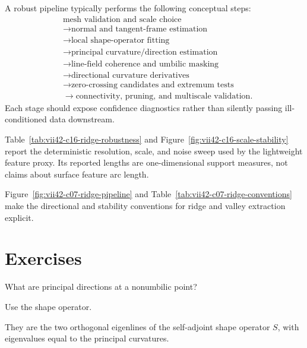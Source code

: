 A robust pipeline typically performs the following conceptual steps:
\[
\begin{aligned}
&\text{mesh validation and scale choice}\\
&\to \text{normal and tangent-frame estimation}\\
&\to \text{local shape-operator fitting}\\
&\to \text{principal curvature/direction estimation}\\
&\to \text{line-field coherence and umbilic masking}\\
&\to \text{directional curvature derivatives}\\
&\to \text{zero-crossing candidates and extremum tests}\\
&\to \text{connectivity, pruning, and multiscale validation}.
\end{aligned}
\]
Each stage should expose confidence diagnostics rather than silently passing
ill-conditioned data downstream.

Table~\ref{tab:vii42-c16-ridge-robustness} and
Figure~\ref{fig:vii42-c16-scale-stability} report the deterministic resolution,
scale, and noise sweep used by the lightweight feature proxy.  Its reported
lengths are one-dimensional support measures, not claims about surface feature
arc length.





Figure~\ref{fig:vii42-c07-ridge-pipeline} and Table~\ref{tab:vii42-c07-ridge-conventions}
make the directional and stability conventions for ridge and valley extraction explicit.


\section{Exercises}

\begin{exercise}\label{exr:vii42-01}
What are principal directions at a nonumbilic point?
\end{exercise}

\begin{hint}
Use the shape operator.
\end{hint}

\begin{solution}
They are the two orthogonal eigenlines of the self-adjoint shape operator \(S\), with eigenvalues equal to the principal curvatures.
\end{solution}

